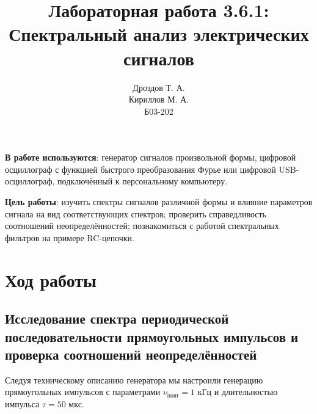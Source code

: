 \documentclass[a4paper,12pt]{article}
\title{Лабораторная работа 3.6.1:\\Спектральный анализ электрических сигналов}
\author{Дроздов Т. А.\\Кириллов М. А.\\Б03-202}
\date{}
\begin{document}
\maketitle

\textbf{В работе используются}: генератор сигналов произвольной формы, цифровой осциллограф с функцией быстрого преобразования Фурье или цифровой USB-осциллограф, подключённый к персональному компьютеру.


\textbf{Цель работы}: 
изучить спектры сигналов различной формы и влияние параметров сигнала
на вид соответствующих спектров; проверить справедливость соотношений неопределённостей; познакомиться с работой спектральных фильтров на примере RC-цепочки.



\section*{Ход работы}
 \subsection*{Исследование спектра периодической последовательности прямоугольных импульсов и проверка соотношений неопределённостей}
Следуя техническому описанию генератора мы настроили генерацию прямоугольных импульсов с параметрами $\nu_{\text{повт}} = 1$ кГц и длительностью импульса $\tau = 50$ мкс.
\end{document}
